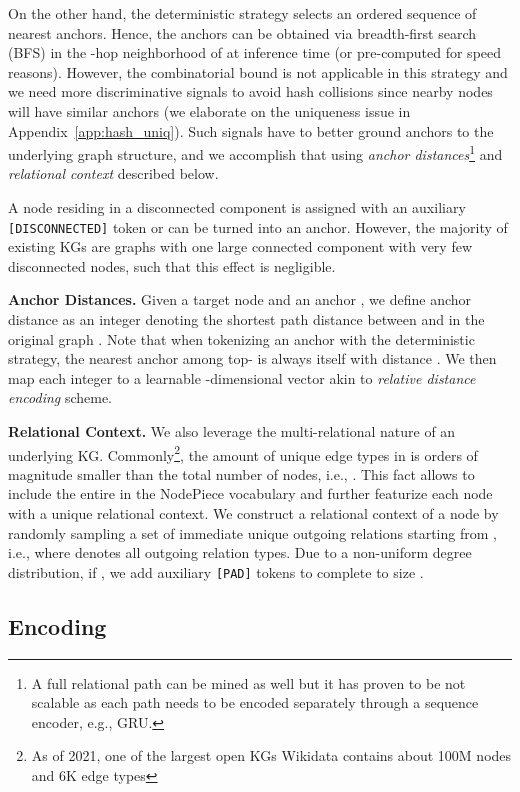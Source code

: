 \documentclass{article} \usepackage{iclr2022_conference,times}
\begin{document}
On the other hand, the deterministic strategy selects an ordered sequence of  nearest anchors. Hence, the anchors can be obtained via breadth-first search (BFS) in the -hop neighborhood of  at inference time (or pre-computed for speed reasons).
However, the combinatorial bound is not applicable in this strategy and we need more discriminative signals to avoid hash collisions since nearby nodes will have similar anchors (we elaborate on the uniqueness issue in Appendix~\ref{app:hash_uniq}). 
Such signals have to better ground anchors to the underlying graph structure, and we accomplish that using \emph{anchor distances}\footnote{A full relational path can be mined as well but it has proven to be not scalable as each path needs to be encoded separately through a sequence encoder, e.g., GRU.} and \emph{relational context} described below.

A node residing in a disconnected component is assigned with an auxiliary \texttt{[DISCONNECTED]} token or can be turned into an anchor. 
However, the majority of existing KGs are graphs with one large connected component with very few disconnected nodes, such that this effect is negligible.

\textbf{Anchor Distances.}
Given a target node  and an anchor , we define anchor distance  as an integer denoting the shortest path distance between  and  in the original graph . 
Note that when tokenizing an anchor  with the deterministic strategy, the nearest anchor among top- is always  itself with distance .
We then map each integer to a learnable -dimensional vector  akin to \emph{relative distance encoding} scheme. 


\textbf{Relational Context.}
We also leverage the multi-relational nature of an underlying KG. 
Commonly\footnote{As of 2021, one of the largest open KGs Wikidata contains about 100M nodes and 6K edge types}, the amount of unique edge types in  is orders of magnitude smaller than the total number of nodes, i.e., . 
This fact allows to include the entire  in the NodePiece vocabulary  and further featurize each node with a unique relational context.
We construct a relational context of a node  by randomly sampling a set of  immediate unique outgoing relations starting from , i.e.,  where  denotes all outgoing relation types. 
Due to a non-uniform degree distribution, if , we add auxiliary \texttt{[PAD]} tokens to complete  to size . 





\subsection{Encoding}
\end{document}
